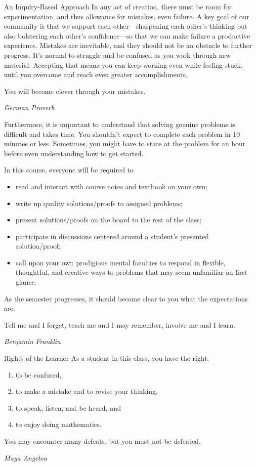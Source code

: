 \begin{section}{An Inquiry-Based Approach}
In any act of creation, there must be room for experimentation, and thus allowance for mistakes, even failure. A key goal of our community is that we support each other---sharpening each other's thinking but also bolstering each other's confidence---so that we can make failure a productive experience. Mistakes are inevitable, and they should not be an obstacle to further progress. It's normal to struggle and be confused as you work through new material. Accepting that means you can keep working even while feeling stuck, until you overcome and reach even greater accomplishments.

\epigraph{You will become clever through your mistakes.}{\emph{German Proverb}}

Furthermore, it is important to understand that solving genuine problems is difficult and takes time.  You shouldn't expect to complete each problem in 10 minutes or less.  Sometimes, you might have to stare at the problem for an hour before even understanding how to get started.

In this course, everyone will be required to
\begin{itemize}
\item read and interact with course notes and textbook on your own;
\item write up quality solutions/proofs to assigned problems;
\item present solutions/proofs on the board to the rest of the class;
\item participate in discussions centered around a student's presented solution/proof;
\item call upon your own prodigious mental faculties to respond in flexible, thoughtful, and creative ways to problems that may seem unfamiliar on first glance.
\end{itemize}
As the semester progresses, it should become clear to you what the expectations are.

\epigraph{Tell me and I forget, teach me and I may remember, involve me and I learn.}{\emph{Benjamin Franklin}}

\end{section}

\begin{section}{Rights of the Learner}
As a student in this class, you have the right:
\begin{enumerate}
\item to be confused,
\item to make a mistake and to revise your thinking,
\item to speak, listen, and be heard, and
\item to enjoy doing mathematics.
\end{enumerate}

\epigraph{You may encounter many defeats, but you must not be defeated.}{\emph{Maya Angelou}}
	
\end{section}

